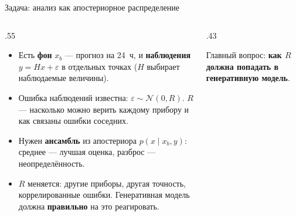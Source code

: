 \documentclass[10pt,aspectratio=169]{beamer}
\begin{document}
\begin{frame}{Задача: анализ как апостериорное распределение}
\begin{columns}[T]
\begin{column}{.55\textwidth}
\begin{itemize}
\item Есть \textbf{фон} $x_b$ --- прогноз на 24~ч, и \textbf{наблюдения} $y = Hx + \varepsilon$ в отдельных точках ($H$ выбирает наблюдаемые величины).
\item Ошибка наблюдений известна: $\varepsilon\sim\mathcal N(0,R)$. $R$ --- насколько можно верить каждому прибору и как связаны ошибки соседних.
\item Нужен \textbf{ансамбль} из апостериора $p(x\mid x_b,y)$: среднее --- лучшая оценка, разброс --- неопределённость.
\item $R$ меняется: другие приборы, другая точность, коррелированные ошибки. Генеративная модель должна \textbf{правильно} на это реагировать.
\end{itemize}
\end{column}
\begin{column}{.43\textwidth}
\begin{center}
\end{center}
\vspace{2mm}
{\small\color{ink} Главный вопрос: \textbf{как $R$ должна попадать в генеративную модель}.}
\end{column}
\end{columns}
\end{frame}
\end{document}
